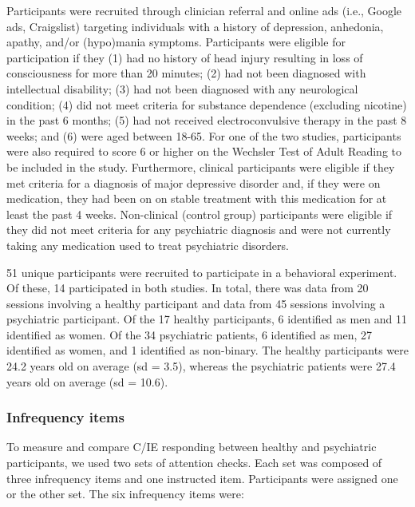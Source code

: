 \documentclass[a4paper,notitlepage,12pt]{article}
\begin{document}
\begin{refsection}[supp]
Participants were recruited through clinician referral and online ads (i.e., Google ads, Craigslist) targeting individuals with a history of depression, anhedonia, apathy, and/or (hypo)mania symptoms. Participants were eligible for participation if they (1) had no history of head injury resulting in loss of consciousness for more than 20 minutes; (2) had not been diagnosed with intellectual disability; (3) had not been diagnosed with any neurological condition; (4) did not meet criteria for substance dependence (excluding nicotine) in the past 6 months; (5) had not received electroconvulsive therapy in the past 8 weeks; and (6) were aged between 18-65. For one of the two studies, participants were also required to score 6 or higher on the Wechsler Test of Adult Reading to be included in the study. Furthermore, clinical participants were eligible if they met criteria for a diagnosis of major depressive disorder and, if they were on medication, they had been on on stable treatment with this medication for at least the past 4 weeks. Non-clinical (control group) participants were eligible if they did not meet criteria for any psychiatric diagnosis and were not currently taking any medication used to treat psychiatric disorders.

51 unique participants were recruited to participate in a behavioral experiment. Of these, 14 participated in both studies. In total, there was data from 20 sessions involving a healthy participant and data from 45 sessions involving a psychiatric participant. Of the 17 healthy participants, 6 identified as men and 11 identified as women. Of the 34 psychiatric patients, 6 identified as men, 27 identified as women, and 1 identified as non-binary. The healthy participants were 24.2 years old on average (sd = 3.5), whereas the psychiatric patients were 27.4 years old on average (sd = 10.6).

\subsubsection*{Infrequency items}

To measure and compare C/IE responding between healthy and psychiatric participants, we used two sets of attention checks. Each set was composed of three infrequency items and one instructed item. Participants were assigned one or the other set. The six infrequency items were:


\end{refsection}
\end{document}
